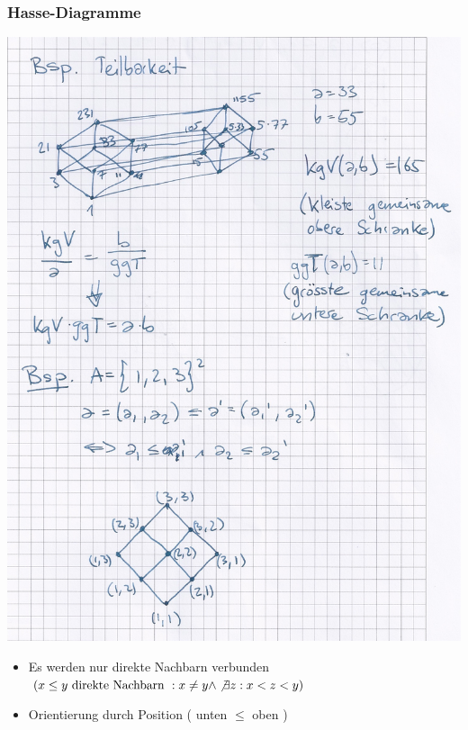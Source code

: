 \subsubsection{Hasse-Diagramme}
\includegraphics[width=\textwidth]{Bild22}
\begin{itemize}
	\item Es werden nur direkte Nachbarn verbunden $( x \leq y \text{ direkte Nachbarn }: x \neq y \wedge \not\exists z : x < z < y )$
	\item Orientierung durch Position ( unten $\leq$ oben )
\end{itemize}